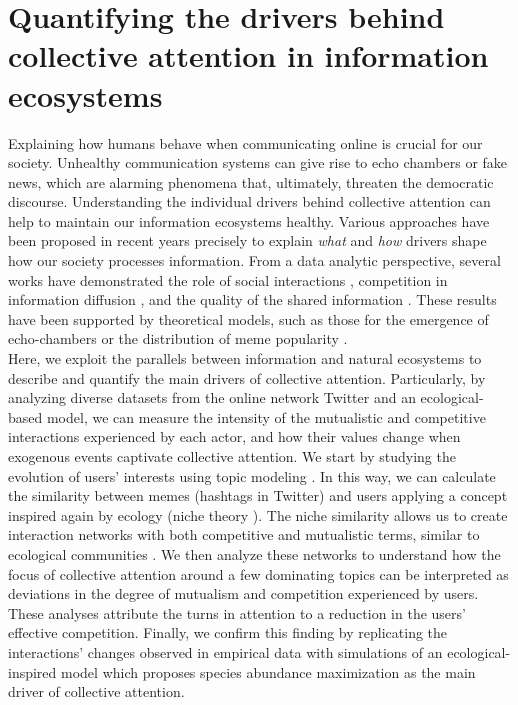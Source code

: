 \chapter{Quantifying the drivers behind collective attention in information ecosystems} \label{chp:3}

Explaining how humans behave when communicating online is crucial for our society. Unhealthy communication systems can give rise to echo chambers or fake news, which are alarming phenomena that, ultimately,  threaten the democratic discourse. Understanding the individual drivers behind collective attention  can help to maintain our information ecosystems healthy.  Various approaches have been proposed in recent years precisely to explain \textit{what} and \textit{how} drivers shape how our society processes information. From a data analytic perspective, several works have demonstrated the role of social interactions \cite{gonccalves2011modeling, romero2011influence, borge2011structural, omodei2015events}, competition in information diffusion \cite{weng2012competition, altman2013competition}, and the quality of the shared information  \cite{qiu2017limited}. These results have been supported by theoretical models, such as those for the emergence of echo-chambers \cite{baumann2020modeling} or the distribution of meme popularity \cite{gleeson2014competition, gleeson2016effects, asur2011trends}.\\

Here, we exploit the parallels between information and natural ecosystems to describe and quantify the main drivers of collective attention. Particularly, by analyzing diverse datasets from the online network Twitter and an ecological-based model, we can measure the intensity of the mutualistic and competitive interactions experienced by each actor, and how their values change when exogenous events captivate collective attention. We start by studying  the evolution of users' interests using topic modeling \cite{lancichinetti2011oslom}. In this way, we can calculate the similarity between memes (hashtags in Twitter) and users applying a concept inspired again by ecology (niche theory \cite{cai2021niches}). The niche similarity allows us to create interaction networks with both competitive and mutualistic terms, similar to ecological communities \cite{palazzi2021ecological}. We then analyze these networks to understand how the focus of collective attention around a few dominating topics can be interpreted as  deviations in the degree of mutualism and competition experienced by users. These analyses attribute the turns in attention to a reduction in the users' effective competition. Finally, we confirm this finding by replicating the interactions' changes observed in empirical data with simulations of an ecological-inspired model which proposes species abundance maximization as the main driver of collective attention.

